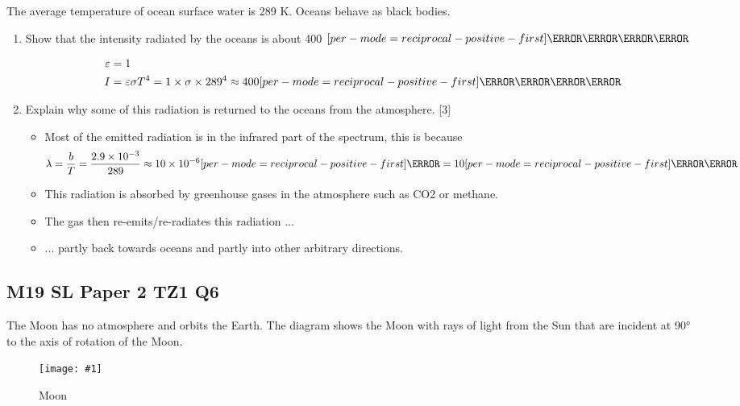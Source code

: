 \documentclass[a4paper,12pt]{article}
\let\oldsi\si
\renewcommand{\si}[1]{\oldsi[per-mode=reciprocal-positive-first]{#1}}
\newcommand{\img}[4]{\begin{center}
  \begin{figure}[H]
    \centering
    \texttt{[image: \#1]}
    \caption{#3}
    \label{fig:#4}
  \end{figure}
\end{center}}
\begin{document}
The average temperature of ocean surface water is 289 K. Oceans behave as black bodies.
\begin{enumerate}[label=(\alph*)]
  \item Show that the intensity radiated by the oceans is about 400 $\si{\W\per\m\squared}$

        \begin{align*}
          \varepsilon & = 1                                                                                       \\
          I           & = \varepsilon \sigma T^4 = 1 \times \sigma \times 289^4 \approx 400 \si{\W\per\m\squared}
        \end{align*}
  \item Explain why some of this radiation is returned to the oceans from the atmosphere. [3]
        \begin{itemize}
          \item Most of the emitted radiation is in the infrared part of the spectrum, this is because $$\lambda = \frac{b}{T} = \frac{2.9 \times 10^{-3}}{289} \approx 10 \times 10^{-6} \si{\m} = 10 \si{\micro\m}$$
          \item This radiation is absorbed by greenhouse gases in the atmosphere such as CO2 or methane.
          \item The gas then re-emits/re-radiates this radiation ...
          \item ... partly back towards oceans and partly into other arbitrary directions.
        \end{itemize}
\end{enumerate}

\pagebreak

\subsection{M19 SL Paper 2 TZ1 Q6}

The Moon has no atmosphere and orbits the Earth. The diagram shows the Moon with rays
of light from the Sun that are incident at 90° to the axis of rotation of the Moon.

\img{ex/1.png}{0.7}{Moon}{moon}
\end{document}
